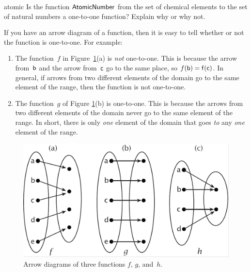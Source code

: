 \begin{exercise}{atomic}
Is the function $\sf{Atomic Number}$ from the set of chemical elements to the set of natural numbers a one-to-one function?  Explain why or why not.
\end{exercise}

\begin{rem}
If you have an arrow diagram of a function, then it is easy to tell whether or not the function is one-to-one. For example:

\begin{enumerate}
\item The function~$f$ in Figure~\ref{arrow11}(a) is \emph{not} one-to-one. This is because the arrow from~$\sf{b}$ and the arrow from~$\sf{c}$ go to the same place, so $f(\sf{b}) = f(\sf{c})$. In general, if arrows from two different elements of the domain go to the same element of the range, then the function is not one-to-one. 
\item The function~$g$ of Figure \ref{arrow11}(b) is one-to-one. This is because the arrows from two different elements of the domain never go to the same element of the range.  In short, there is only \emph{one} element of the domain that goes \emph{to} any \emph{one} element of the range.  
\end{enumerate}
\end{rem}
\begin{figure}[h]
\includegraphics[width=4.5in]{images/arrow11.png}
\caption{Arrow diagrams of three functions $f$, $g$, and~$h$.}
\label{arrow11}
\end{figure}

